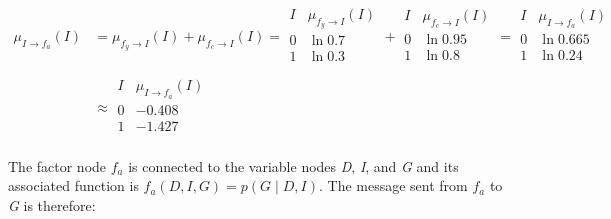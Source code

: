 \documentclass[a4paper, 12pt]{article}
\begin{document}
\begin{align}
	\mu_{I \to f_a}(I) &= \mu_{f_y \to I}(I) + \mu_{f_c \to I}(I) = \begin{array}{c|c}
		I & \mu_{f_y \to I}(I)\\
		\hline
		0 & \ln 0.7\\
		1 & \ln 0.3\\
	\end{array} + \begin{array}{c|c}
		I & \mu_{f_c \to I}(I)\\
		\hline
		0 & \ln 0.95\\
		1 & \ln 0.8\\
	\end{array} = \begin{array}{c|c}
		I & \mu_{I \to f_a}(I)\\
		\hline
		0 & \ln 0.665\\
		1 & \ln 0.24\\
	\end{array}\\
	&\approx \begin{array}{c|c}
		I & \mu_{I \to f_a}(I)\\
		\hline
		0 & -0.408\\
		1 & -1.427\\
	\end{array}
\end{align}

The factor node $f_a$ is connected to the variable nodes \textit{D}, \textit{I}, and \textit{G} and its associated function is $f_a(D, I, G) = p(G \mid D, I)$. The message sent from $f_a$ to \textit{G} is therefore:
\end{document}

